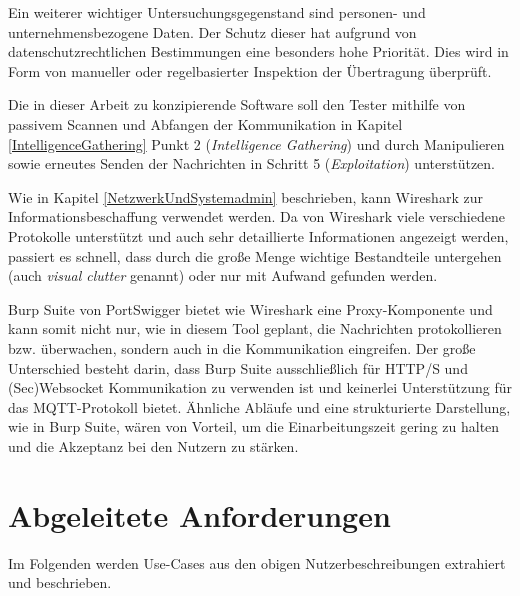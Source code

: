     Ein weiterer wichtiger Untersuchungsgegenstand sind personen- und unternehmensbezogene Daten. Der Schutz dieser hat aufgrund von datenschutzrechtlichen Bestimmungen eine besonders hohe Priorität. Dies wird in Form von manueller oder regelbasierter Inspektion der Übertragung überprüft.
    
    
    Die in dieser Arbeit zu konzipierende Software soll den Tester mithilfe von passivem Scannen und Abfangen der Kommunikation in Kapitel \ref{IntelligenceGathering} Punkt 2 (\emph{Intelligence Gathering}) und durch Manipulieren sowie erneutes Senden der Nachrichten in Schritt 5 (\emph{Exploitation}) unterstützen.
    
    Wie in Kapitel \ref{NetzwerkUndSystemadmin} beschrieben, kann Wireshark zur Informationsbeschaffung verwendet werden.
    Da von Wireshark viele verschiedene Protokolle unterstützt und auch sehr detaillierte Informationen angezeigt werden, passiert es schnell, dass durch die große Menge wichtige Bestandteile untergehen (auch \emph{visual clutter} genannt) oder nur mit Aufwand gefunden werden.
    
    Burp Suite von PortSwigger bietet wie Wireshark eine Proxy-Komponente und kann somit nicht nur, wie in diesem Tool geplant, die Nachrichten protokollieren bzw. überwachen, sondern auch in die Kommunikation eingreifen. Der große Unterschied besteht darin, dass Burp Suite ausschließlich für HTTP/S und (Sec)Websocket Kommunikation zu verwenden ist und keinerlei Unterstützung für das \ac{MQTT}-Protokoll bietet. Ähnliche Abläufe und eine strukturierte Darstellung, wie in Burp Suite, wären von Vorteil, um die Einarbeitungszeit gering zu halten und die Akzeptanz bei den Nutzern zu stärken.

\section{Abgeleitete Anforderungen}
    Im Folgenden werden Use-Cases aus den obigen Nutzerbeschreibungen extrahiert und beschrieben.

